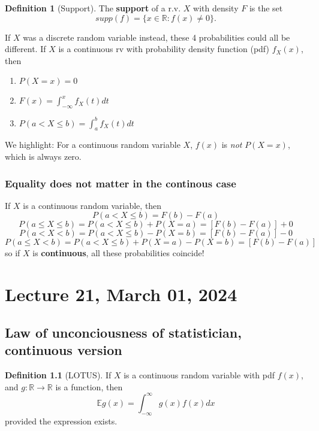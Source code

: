 \documentclass[
]{book}
\providecommand{\tightlist}{%
  \setlength{\itemsep}{0pt}\setlength{\parskip}{0pt}}
\theoremstyle{definition}
\newtheorem{definition}{Definition}[chapter]
\theoremstyle{definition}
\theoremstyle{definition}
\theoremstyle{definition}
\theoremstyle{remark}
\begin{document}
\begin{definition}[Support]
The \textbf{support} of a r.v. \(X\) with density \(F\) is the set
\[
supp(f) = \{x \in \mathbb{R}: f(x) \neq 0\}.
\]
\end{definition}

If \(X\) was a discrete random variable instead, these 4 probabilities could all be different.
If \(X\) is a continuous rv with probability density function (pdf) \(f_X(x)\), then

\begin{enumerate}
\def\labelenumi{\arabic{enumi}.}
\tightlist
\item
  \(P(X=x)=0\)
\item
  \(F(x) = \int_{-\infty}^x f_X(t)dt\)
\item
  \(P(a < X \leq b) = \int_a^b f_X(t)dt\)
\end{enumerate}

We highlight: For a continuous random variable \(X\), \(f(x)\) is \emph{not} \(P(X=x)\), which is always zero.

\subsection{Equality does not matter in the continous case}\label{equality-does-not-matter-in-the-continous-case}

If \(X\) is a continuous random variable, then
\[ P(a<X\leq b) = F(b)-F(a)\]
\[ P(a\leq X \leq b) =  P(a<X\leq b) +P(X=a)=[F(b)-F(a)]+0\]
\[ P(a<X<b)=P(a<X\leq b) -P(X=b)=[F(b)-F(a)]-0\]
\[ P(a\leq X<b) = P(a<X\leq b) +P(X=a)-P(X=b)=[F(b)-F(a)]\]
so if \(X\) is \textbf{continuous}, all these probabilities coincide!

\chapter{Lecture 21, March 01, 2024}\label{lecture-21-march-01-2024}

\newcommand{\var}{\mathbb{V}ar}
\newcommand{\R}{\mathbb{R}}
\newcommand{\E}{\mathbb{E}}

\section{Law of unconciousness of statistician, continuous version}\label{law-of-unconciousness-of-statistician-continuous-version}

\begin{definition}[LOTUS]
If \(X\) is a continuous random variable with pdf \(f(x)\), and \(g:\mathbb{R}\to \mathbb{R}\) is a function, then
\[
  \mathbb{E}g(x) = \int_{-\infty}^\infty g(x)f(x)dx
\]
provided the expression exists.
\end{definition}
\end{document}
